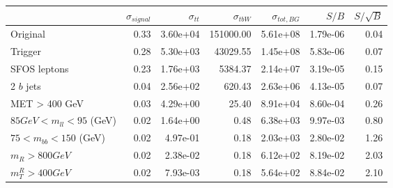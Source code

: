 \begin{tabular}{lrrrrrr}
\toprule
{} &  $\sigma_{signal}$ &  $\sigma_{tt}$ &  $\sigma_{tbW}$ &  $\sigma_{tot, BG}$ &     $S/B$ &  $S/\sqrt{B}$ \\
\midrule
Original                     &               0.33 &       3.60e+04 &       151000.00 &           5.61e+08 &  1.79e-06 &          0.04 \\
Trigger                      &               0.28 &       5.30e+03 &        43029.55 &           1.45e+08 &  5.83e-06 &          0.07 \\
SFOS leptons                 &               0.23 &       1.76e+03 &         5384.37 &           2.14e+07 &  3.19e-05 &          0.15 \\
2 $b$ jets                   &               0.04 &       2.56e+02 &          620.43 &           2.63e+06 &  4.13e-05 &          0.07 \\
MET > 400 GeV                &               0.03 &       4.29e+00 &           25.40 &           8.91e+04 &  8.60e-04 &          0.26 \\
$85 GeV < m_{ll} < 95$ (GeV) &               0.02 &       1.64e+00 &            0.48 &           6.38e+03 &  9.97e-03 &          0.80 \\
$75 < m_{bb} < 150$ (GeV)    &               0.02 &       4.97e-01 &            0.18 &           2.03e+03 &  2.80e-02 &          1.26 \\
$m_{R} > 800 GeV$            &               0.02 &       2.38e-02 &            0.18 &           6.12e+02 &  8.19e-02 &          2.03 \\
$m_{T}^{R} > 400 GeV$        &               0.02 &       7.93e-03 &            0.18 &           5.64e+02 &  8.84e-02 &          2.10 \\
\bottomrule
\end{tabular}

